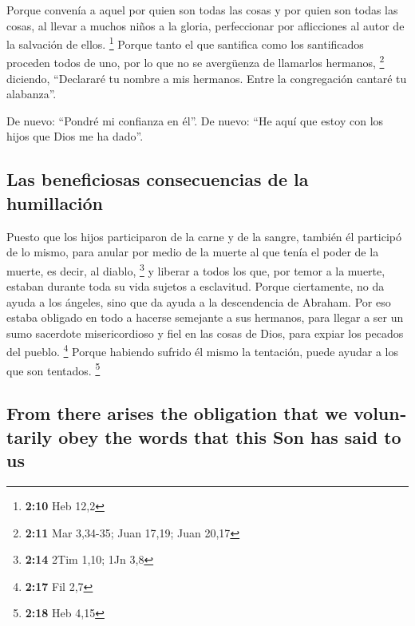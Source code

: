 \begin{paracol}{2}
 Porque convenía a aquel por quien son todas las cosas y
por quien son todas las cosas, al llevar a muchos niños a la gloria,
perfeccionar por aflicciones al autor de la salvación de ellos.
\footnote{\textbf{2:10} Heb 12,2}  Porque tanto el que
santifica como los santificados proceden todos de uno, por lo que no se
avergüenza de llamarlos hermanos, \footnote{\textbf{2:11} Mar 3,34-35;
  Juan 17,19; Juan 20,17}  diciendo, ``Declararé tu
nombre a mis hermanos. Entre la congregación cantaré tu alabanza''.

 De nuevo: ``Pondré mi confianza en él''. De nuevo: ``He
aquí que estoy con los hijos que Dios me ha dado''.

\hypertarget{las-beneficiosas-consecuencias-de-la-humillaciuxf3n}{%
\subsection{Las beneficiosas consecuencias de la
humillación}\label{las-beneficiosas-consecuencias-de-la-humillaciuxf3n}}

 Puesto que los hijos participaron de la carne y de la
sangre, también él participó de lo mismo, para anular por medio de la
muerte al que tenía el poder de la muerte, es decir, al diablo,
\footnote{\textbf{2:14} 2Tim 1,10; 1Jn 3,8}  y liberar a
todos los que, por temor a la muerte, estaban durante toda su vida
sujetos a esclavitud.  Porque ciertamente, no da ayuda a
los ángeles, sino que da ayuda a la descendencia de Abraham.
 Por eso estaba obligado en todo a hacerse semejante a
sus hermanos, para llegar a ser un sumo sacerdote misericordioso y fiel
en las cosas de Dios, para expiar los pecados del pueblo. \footnote{\textbf{2:17}
  Fil 2,7}  Porque habiendo sufrido él mismo la
tentación, puede ayudar a los que son tentados. \footnote{\textbf{2:18}
  Heb 4,15}

\switchcolumn
\begin{otherlanguage}{english}

\hypertarget{from-there-arises-the-obligation-that-we-voluntarily-obey-the-words-that-this-son-has-said-to-us}{%
\subsection{From there arises the obligation that we voluntarily obey
the words that this Son has said to
us}\label{from-there-arises-the-obligation-that-we-voluntarily-obey-the-words-that-this-son-has-said-to-us}}


\end{otherlanguage}
\end{paracol}
